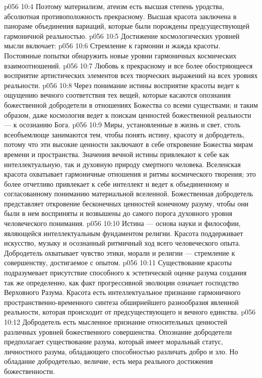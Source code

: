 \vs p056 10:4 Поэтому материализм, атеизм есть высшая степень уродства, абсолютная противоположность прекрасному. Высшая красота заключена в панораме объединения вариаций, которые были порождены предсуществующей гармоничной реальностью.
\vs p056 10:5 Достижение космологических уровней мысли включает:
\vs p056 10:6 \bibnobreakspace {} Стремление к гармонии и жажда красоты. Постоянные попытки обнаружить новые уровни гармоничных космических взаимоотношений.
\vs p056 10:7 \bibnobreakspace {} Любовь к прекрасному и все более обостряющееся восприятие артистических элементов всех творческих выражений на всех уровнях реальности.
\vs p056 10:8 \bibnobreakspace {} Через понимание истины восприятие красоты ведет к ощущению вечного соответствия тех вещей, которые касаются опознания божественной добродетели в отношениях Божества со всеми существами; и таким образом, даже космология ведет к поискам ценностей божественной реальности --- к осознанию Бога.
\vs p056 10:9 \pc Миры, установленные в жизнь и свет, столь всеобъемлюще занимаются тем, чтобы понять истину, красоту и добродетель, потому что эти высокие ценности заключают в себе откровение Божества мирам времени и пространства. Значения вечной истины привлекают к себе как интеллектуальную, так и духовную природу смертного человека. Вселенская красота охватывает гармоничные отношения и ритмы космического творения; это более отчетливо привлекает к себе интеллект и ведет к объединенному и согласованному пониманию материальной вселенной. Божественная добродетель представляет откровение бесконечных ценностей конечному разуму, чтобы они были в нем восприняты и возвышены до самого порога духовного уровня человеческого понимания.
\vs p056 10:10 Истина --- основа науки и философии, являющейся интеллектуальным фундаментом религии. Красота поддерживает искусство, музыку и осознанный ритмичный ход всего человеческого опыта. Добродетель охватывает чувство этики, морали и религии --- стремление к совершенству, достигаемое с опытом.
\vs p056 10:11 Существование красоты подразумевает присутствие способного к эстетической оценке разума создания так же определенно, как факт прогрессивной эволюции означает господство Верховного Разума. Красота есть интеллектуальное признание гармоничного пространственно\hyp{}временного синтеза обширнейшего разнообразия явленной реальности, которая происходит от предсуществующего и вечного единства.
\vs p056 10:12 Добродетель есть мысленное признание относительных ценностей различных уровней божественного совершенства. Опознание добродетели предполагает существование разума, который имеет моральный статус, личностного разума, обладающего способностью различать добро и зло. Но обладание добродетелью, величие, есть мера реального достижения божественности.
